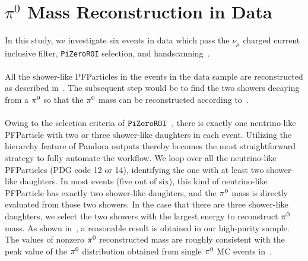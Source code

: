 \section{$\pi^{0}$ Mass Reconstruction in Data}
\label{sec:data_pi0}

In this study, we investigate six events in data which pass
the $\nu_{\mu}$ charged current inclusive filter, 
\texttt{PiZeroROI} selection, and 
handscanning~\cite{MicroBooNE-Note-1012-INT}.\\
\\
All the shower-like PFParticles in the events in the data sample
are reconstructed as described in~.
The subsequent step would be to find the two showers decaying from a 
${\pi}^0$ so that the ${\pi}^0$ mass can be reconstructed according
to~. \\
\\
Owing to the selection criteria of $\texttt{PiZeroROI}$~\cite{MicroBooNE-Note-1012-INT}, 
there is exactly one
neutrino-like PFParticle with two or three shower-like daughters in
each event.
Utilizing the hierarchy feature of Pandora outputs thereby becomes
the most straightforward strategy to fully automate the workflow.
We loop over all the neutrino-like PFParticles (PDG code 12 or 14), 
identifying the one with at least two shower-like daughters.
In most events (five out of six), this kind of neutrino-like 
PFParticle has exactly two 
shower-like daughters, and the ${\pi}^0$ mass is directly evaluated
from those two showers.
In the case that there are three shower-like daughters, we
select the two showers with the largest
energy to reconstruct ${\pi}^0$ mass.
As shown in~,
a reasonable result is obtained in our high-purity sample.
The values of nonzero ${\pi}^0$ reconstructed mass are roughly
consistent with the peak value of the ${\pi}^0$ distribution obtained
from single ${\pi}^0$ MC events in~.\\
\\
